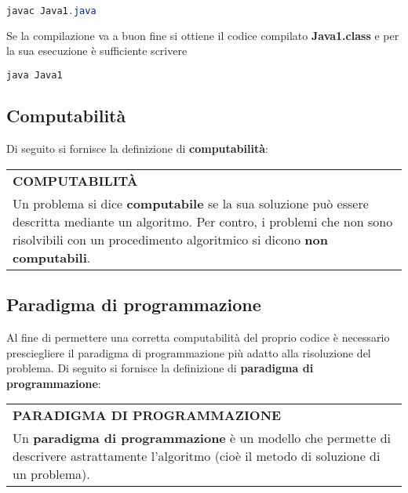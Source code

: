 \documentclass[a4paper]{extarticle}
\renewcommand\arraystretch{}
\begin{document}
\begin{lstlisting}[language=Java, caption=Esempio di compilazione in Java]
  javac Java1.java
\end{lstlisting}

\vspace{1em}
\noindent
Se la compilazione va a buon fine si ottiene il codice compilato \textbf{Java1.class} e per la sua esecuzione è sufficiente scrivere

\begin{lstlisting}[language=Java, caption=Esempio di esecuzione in Java]
  java Java1
\end{lstlisting}

\vspace{1em}
\subsection{Computabilità}
Di seguito si fornisce la definizione di \textbf{computabilità}:

\vspace{1em}
\setlength{\tabcolsep}{14pt}
\renewcommand{\arraystretch}{2}
\noindent
\begin{tabularx}{\textwidth}{@{}|P|@{}}
    \hline
    {\textbf{COMPUTABILITÀ}}\\
    \parbox{\linewidth}{Un problema si dice \textbf{computabile} se la sua soluzione può essere descritta mediante un algoritmo. Per contro, i problemi che non sono risolvibili con un procedimento algoritmico si dicono \textbf{non computabili}.\vspace{3mm}}\\
    \hline
\end{tabularx}

\newpage
\noindent
\subsection{Paradigma di programmazione}
Al fine di permettere una corretta computabilità del proprio codice è necessario presciegliere il paradigma di programmazione più adatto alla risoluzione del problema. Di seguito si fornisce la definizione di \textbf{paradigma di programmazione}:

\vspace{1em}
\setlength{\tabcolsep}{14pt}
\renewcommand{\arraystretch}{2}
\noindent
\begin{tabularx}{\textwidth}{@{}|P|@{}}
    \hline
    {\textbf{PARADIGMA DI PROGRAMMAZIONE}}\\
    \parbox{\linewidth}{Un \textbf{paradigma di programmazione} è un modello che permette di descrivere astrattamente l’algoritmo (cioè il metodo di soluzione di un problema).\vspace{3mm}}\\
    \hline
\end{tabularx}
\end{document}
